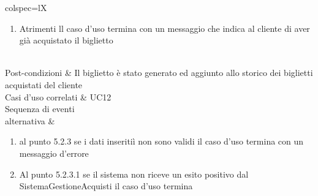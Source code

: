 \begin{table}[H]
\begin{scenery}{colspec=lX}
\begin{enumerate}[label=\arabic*.]
				\item Atrimenti ll caso d'uso termina con un messaggio che indica al cliente di aver già acquistato il biglietto
			\end{enumerate} \\
		Post-condizioni & Il biglietto è stato generato ed aggiunto allo storico dei biglietti acquistati del cliente\\
		Casi d'uso correlati & UC12 \\
		{Sequenza di eventi \\ alternativa} &
			\begin{enumerate}[label=\arabic*.]
				\item al punto 5.2.3 se i dati inseritiì non sono validi il caso d'uso termina con un messaggio d'errore
				\item Al punto 5.2.3.1 se il sistema non riceve un esito positivo dal SistemaGestioneAcquisti il caso d'uso termina
			\end{enumerate} \\
	\end{scenery}
\end{table}